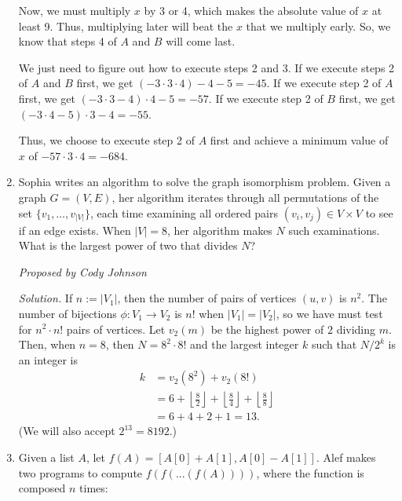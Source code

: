 \documentclass[10pt]{article}
\newcommand{\proposed}[1]
{
\vspace{5pt}
\noindent\textit{Proposed by #1}
}
\newcommand{\solution}
{
\vspace{5pt}
\noindent\textit{Solution.}\qquad
}
\begin{document}
\begin{enumerate}
\par Now, we must multiply $x$ by 3 or 4, which makes the absolute value of $x$ at least 9. Thus, multiplying later will beat the $x$ that we multiply early. So, we know that steps 4 of $A$ and $B$ will come last. 

\par We just need to figure out how to execute steps 2 and 3. If we execute steps 2 of $A$ and $B$ first, we get $(-3\cdot 3\cdot 4) - 4 - 5 = -45$. If we execute step 2 of $A$ first, we get $(-3\cdot 3 - 4)\cdot 4 - 5 = -57$. If we execute step 2 of $B$ first, we get $(-3\cdot 4 - 5)\cdot 3 - 4 = -55$. 

\par Thus, we choose to execute step 2 of $A$ first and achieve a minimum value of $x$ of $-57\cdot 3\cdot 4 = \boxed{-684}$. 

\item Sophia writes an algorithm to solve the graph isomorphism problem. Given a graph $G=(V,E)$, her algorithm iterates through all permutations of the set $\{v_1, \dots, v_{|V|}\}$, each time examining all ordered pairs $(v_i,v_j)\in V\times V$ to see if an edge exists. When $|V|=8$, her algorithm makes $N$ such examinations. What is the largest power of two that divides $N$?

\proposed{Cody Johnson}

\solution If $n := |V_1|$, then the number of pairs of vertices $(u,v)$ is
$n^2$. The number of bijections $\phi: V_1 \to V_2$ is $n!$ when $|V_1| =
|V_2|$, so we have must test for $n^2\cdot n!$ pairs of vertices. Let
$v_{2}(m)$ be the highest power of $2$ dividing $m$. Then, when $n = 8$, then $N = 8^2\cdot 8!$ and the largest integer $k$ such that $N/2^k$ is an integer is \begin{align*}k &= v_2(8^2) + v_2(8!) \\&= 6 + \left\lfloor \frac82 \right\rfloor + \left\lfloor \frac84 \right\rfloor + \left\lfloor \frac88 \right\rfloor \\&= 6 + 4 + 2 + 1 = \boxed{13}.\end{align*}  (We will also accept $2^{13} = 8192$.)

\item Given a list $A$, let $f(A) = [A[0] + A[1], A[0] - A[1]]$. Alef makes two programs to compute $f(f(...(f(A))))$, where the function is composed $n$ times:


\end{enumerate}
\end{document}
